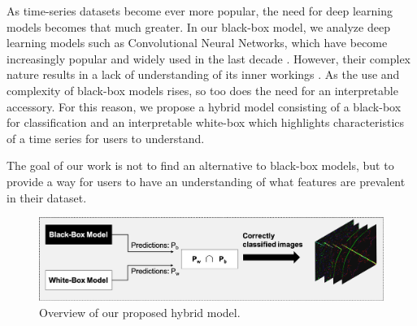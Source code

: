 \documentclass{turabian-thesis}
\begin{document}
As time-series datasets become ever more popular, the need for deep learning models becomes that much greater. In our black-box model, we analyze deep learning models such as Convolutional Neural Networks, which have become increasingly popular and widely used in the last decade  \cite{cui_multi-scale_2016}. However, their complex nature results in a lack of understanding of its inner workings \cite{wang_hybrid_2019}.
As the use and complexity of black-box models rises, so too does the need for an interpretable accessory. For this reason, we propose a hybrid model consisting of a black-box for classification and an interpretable white-box which highlights characteristics of a time series for users to understand.

The goal of our work is not to find an alternative to black-box models, but to provide a way for users to have an understanding of what features are prevalent in their dataset.

\begin{figure}[h!]
   \begin{center}
      \includegraphics[scale=0.5]{../media/overview_model.png}
   \end{center}
   \caption{Overview of our proposed hybrid model.}
   \label{fig:overview_model}
\end{figure}

\end{document}
